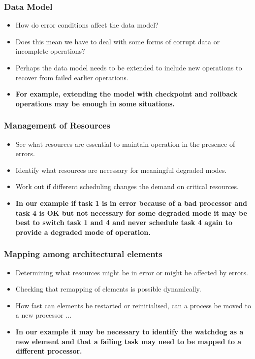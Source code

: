 \documentclass[a4paper]{article}
\begin{document}
\subsubsection{Data Model}
\begin{itemize}
\item{How do error conditions affect the data model?}
\item{Does this mean we have to deal with some forms of corrupt data or incomplete operations?}
\item{Perhaps the data model needs to be extended to include new operations to recover from failed earlier operations.}
\item \textbf{For example, extending the model with checkpoint and rollback operations may be enough in some situations.}
\end{itemize}

\subsubsection{Management of Resources}
\begin{itemize}
\item{See what resources are essential to maintain operation in the presence of errors.}
\item{Identify what resources are necessary for meaningful degraded modes.}
\item{Work out if different scheduling changes the demand on critical resources.}
\item \textbf{In our example if task 1 is in error because of a bad processor and task 4 is OK but not necessary for some degraded mode it may be best to switch task 1 and 4 and never schedule task 4 again to provide a degraded mode of operation.}
\end{itemize}

\subsubsection{Mapping among architectural elements}
\begin{itemize}
\item{Determining what resources might be in error or might be affected by errors.}
\item{Checking that remapping of elements is possible dynamically.}
\item{How fast can elements be restarted or reinitialised, can a process be moved to a new processor ...}
\item \textbf{In our example it may be necessary to identify the watchdog as a new element and that a failing task may need to be mapped to a different processor.}
\end{itemize}
\end{document}
